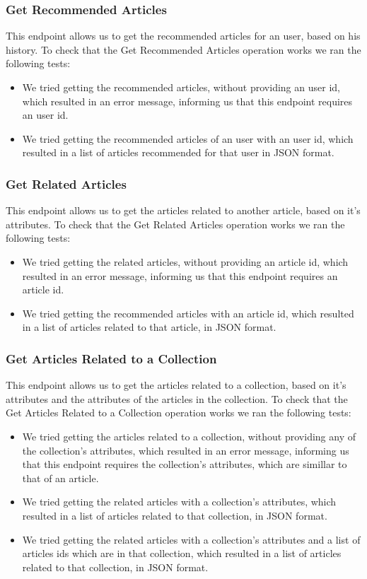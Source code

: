 \subsubsection{Get Recommended Articles}
\label{sec:basic-operations-add-user}
This endpoint allows us to get the recommended articles for an user, based on his history. To check that the Get Recommended Articles operation works we ran the following tests: 
\begin{itemize}
	\item We tried getting the recommended articles, without providing an user id, which resulted in an error message, informing us that this endpoint requires an user id.
	\item We tried getting the recommended articles of an user with an user id, which resulted in a list of articles recommended for that user in JSON format.
\end{itemize}

\subsubsection{Get Related Articles}
\label{sec:basic-operations-add-user}
This endpoint allows us to get the articles related to another article, based on it's attributes. To check that the Get Related Articles operation works we ran the following tests: 
\begin{itemize}
	\item We tried getting the related articles, without providing an article id, which resulted in an error message, informing us that this endpoint requires an article id.
	\item We tried getting the recommended articles with an article id, which resulted in a list of articles related to that article, in JSON format.
\end{itemize}

\subsubsection{Get Articles Related to a Collection}
\label{sec:basic-operations-add-user}
This endpoint allows us to get the articles related to a collection, based on it's attributes and the attributes of the articles in the collection. To check that the Get Articles Related to a Collection operation works we ran the following tests: 
\begin{itemize}
	\item We tried getting the articles related to a collection, without providing any of the collection's attributes, which resulted in an error message, informing us that this endpoint requires the collection's attributes, which are simillar to that of an article.
	\item We tried getting the related articles with a collection's attributes, which resulted in a list of articles related to that collection, in JSON format.
	\item We tried getting the related articles with a collection's attributes and a list of articles ids which are in that collection, which resulted in a list of articles related to that collection, in JSON format.
\end{itemize}

